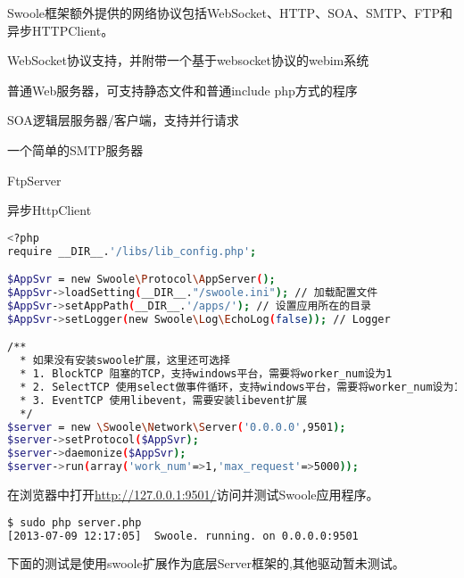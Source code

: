 Swoole框架额外提供的网络协议包括WebSocket、HTTP、SOA、SMTP、FTP和异步HTTPClient。

\begin{compactitem}
\item WebSocket协议支持，并附带一个基于websocket协议的webim系统
\item 普通Web服务器，可支持静态文件和普通include php方式的程序
\item SOA逻辑层服务器/客户端，支持并行请求
\item 一个简单的SMTP服务器
\item FtpServer
\item 异步HttpClient
\end{compactitem}



\begin{lstlisting}[language=bash]
<?php
require __DIR__.'/libs/lib_config.php';

$AppSvr = new Swoole\Protocol\AppServer();
$AppSvr->loadSetting(__DIR__."/swoole.ini"); // 加载配置文件
$AppSvr->setAppPath(__DIR__.'/apps/'); // 设置应用所在的目录
$AppSvr->setLogger(new Swoole\Log\EchoLog(false)); // Logger

/**
  * 如果没有安装swoole扩展，这里还可选择
  * 1. BlockTCP 阻塞的TCP，支持windows平台，需要将worker_num设为1
  * 2. SelectTCP 使用select做事件循环，支持windows平台，需要将worker_num设为1
  * 3. EventTCP 使用libevent，需要安装libevent扩展
  */
$server = new \Swoole\Network\Server('0.0.0.0',9501);
$server->setProtocol($AppSvr);
$server->daemonize($AppSvr);
$server->run(array('work_num'=>1,'max_request'=>5000));
\end{lstlisting}

在浏览器中打开\url{http://127.0.0.1:9501/}访问并测试Swoole应用程序。

\begin{lstlisting}[language=bash]
$ sudo php server.php
[2013-07-09 12:17:05]  Swoole. running. on 0.0.0.0:9501
\end{lstlisting}


下面的测试是使用swoole扩展作为底层Server框架的,其他驱动暂未测试。



